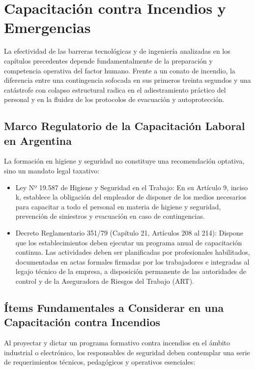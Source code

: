 \chapter{Capacitación contra Incendios y Emergencias}
\label{sec.cap7:capacitacion_emergencias}

La efectividad de las barreras tecnológicas y de ingeniería analizadas en los capítulos precedentes depende
fundamentalmente de la preparación y competencia operativa del factor humano. Frente a un conato de incendio, la
diferencia entre una contingencia sofocada en sus primeros treinta segundos y una catástrofe con colapso estructural
radica en el adiestramiento práctico del personal y en la fluidez de los protocolos de evacuación y autoprotección.

\section{Marco Regulatorio de la Capacitación Laboral en Argentina}

La formación en higiene y seguridad no constituye una recomendación optativa, sino un mandato legal taxativo:
\begin{itemize}
    \item Ley Nº 19.587 de Higiene y Seguridad en el Trabajo: En su Artículo 9, inciso k, establece la obligación del
          empleador de disponer de los medios necesarios para capacitar a todo el personal en materia de higiene y
          seguridad, prevención de siniestros y evacuación en caso de contingencias.
    \item Decreto Reglamentario 351/79 (Capítulo 21, Artículos 208 al 214): Dispone que los establecimientos deben
          ejecutar un programa anual de capacitación continua. Las actividades deben ser planificadas por profesionales
          habilitados, documentadas en actas formales firmadas por los trabajadores e integradas al legajo técnico de la
          empresa, a disposición permanente de las autoridades de control y de la Aseguradora de Riesgos del Trabajo (ART).
\end{itemize}

\section{Ítems Fundamentales a Considerar en una Capacitación contra Incendios}
\label{sec.cap7:items_capacitacion}

Al proyectar y dictar un programa formativo contra incendios en el ámbito industrial o electrónico, los responsables de
seguridad deben contemplar una serie de requerimientos técnicos, pedagógicos y operativos esenciales:

